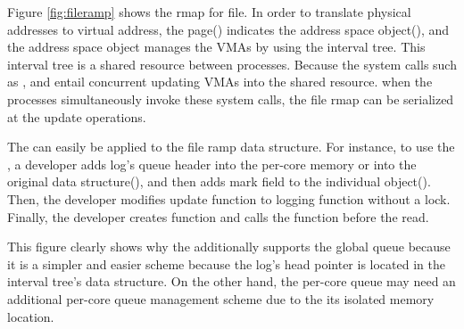 Figure \ref{fig:fileramp} shows the rmap for file.
In order to translate physical addresses to virtual address, the page()
indicates the address space object(), and
the address space object manages the VMAs by using the
interval tree.
This interval tree is a shared resource between processes.
Because the system calls such as ,  and
 entail concurrent updating VMAs into the shared resource.
when the processes simultaneously invoke these system calls, the
file rmap can be serialized at the update operations.

The \LDU can easily be applied to the file ramp data structure.
For instance, to use the \LDU, a developer adds log's queue header into the per-core
memory or into the original data structure(), and
then adds mark field to the individual object().
Then, the developer modifies update function to logging function without a lock.
Finally, the developer creates  function and calls
the  function before the read.

This figure clearly shows why the \LDU additionally supports the
global queue because it is a simpler and easier scheme because the log's head
pointer is located in the interval tree's data structure.
On the other hand, the
per-core queue may need an additional per-core queue management scheme due
to the its isolated memory location.

